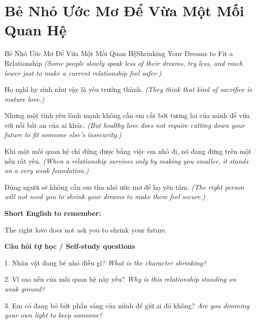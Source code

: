 \section{Bẻ Nhỏ Ước Mơ Để Vừa Một Mối Quan Hệ}
\begin{truyen}{Bẻ Nhỏ Ước Mơ Để Vừa Một Mối Quan Hệ}{Shrinking Your Dreams to Fit a Relationship}
\textit{(Some people slowly speak less of their dreams, try less, and reach lower just to make a current relationship feel safer.)}

Họ nghĩ hy sinh như vậy là yêu trưởng thành.
\textit{(They think that kind of sacrifice is mature love.)}

Nhưng một tình yêu lành mạnh không cần em cắt bớt tương lai của mình để vừa với nỗi bất an của ai khác.
\textit{(But healthy love does not require cutting down your future to fit someone else's insecurity.)}

Khi một mối quan hệ chỉ đứng được bằng việc em nhỏ đi, nó đang đứng trên một nền rất yếu.
\textit{(When a relationship survives only by making you smaller, it stands on a very weak foundation.)}

\end{truyen}

\begin{baihoc}
Đúng người sẽ không cần em thu nhỏ ước mơ để họ yên tâm.
\textit{(The right person will not need you to shrink your dreams to make them feel secure.)}
\end{baihoc}

\begin{ghinhoanh}
\textbf{Short English to remember:}

The right love does not ask you to shrink your future.

\end{ghinhoanh}

\begin{tuhocnhanh}
\textbf{Câu hỏi tự học / Self-study questions}

1. Nhân vật đang bẻ nhỏ điều gì? \textit{What is the character shrinking?}

2. Vì sao nền của mối quan hệ này yếu? \textit{Why is this relationship standing on weak ground?}

3. Em có đang bỏ bớt phần sáng của mình để giữ ai đó không? \textit{Are you dimming your own light to keep someone?}
\end{tuhocnhanh}
\ngancach

